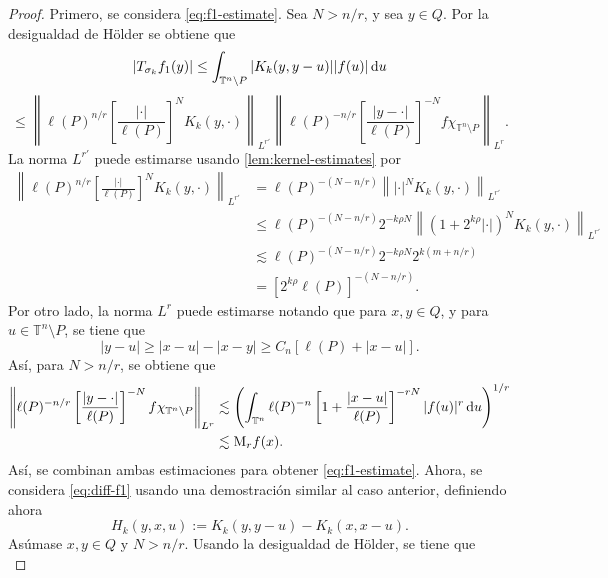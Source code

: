 \begin{proof}
	Primero, se considera \cref{eq:f1-estimate}. Sea $N>n/r$, y sea $y\in Q$. Por la desigualdad de H\"older se obtiene que
	\begin{equation*}
		|T_{\sigma_k}f_1(y)| \leq \int_{\mathbb{T}^n\setminus P} |K_k(y, y-u)||f(u)|\mathop{}\!\mathrm{d} u 
	\end{equation*}
	\begin{equation*}
		\leq \left\| \ell(P)^{n/r} \left[ \frac{|\cdot|}{\ell(P)} \right]^N K_k(y, \cdot) 
		\right\|_{L^{r'}} \left\| \ell(P)^{-n/r} \left[ \frac{|y-\cdot|}{\ell(P)} \right]^{-N} f\chi_{\mathbb{T}^n\setminus P} 
		\right\|_{L^r}.
	\end{equation*}
	La norma $L^{r'}$ puede estimarse usando \cref{lem:kernel-estimates} por 
	\begin{align*}
		\left\| \ell(P)^{n/r} \left[ \frac{|\cdot|}{\ell(P)} \right]^N K_k(y, \cdot) 
		\right\|_{L^{r'}} & = \ell(P)^{-(N-n/r)} \left\| |\cdot|^N K_k(y, \cdot)  \right\|_{L^{r'}} \\
		& \leq \ell(P)^{-(N-n/r)} 2^{-k\rho N} \left\| (1+2^{k\rho} |\cdot|)^N K_k(y, \cdot)  \right\|_{L^{r'}} \\
		& \lesssim \ell(P)^{-(N-n/r)} 2^{-k\rho N} 2^{k(m+n/r)}\\
		& = [2^{k\rho}\ell(P)]^{-(N-n/r)}.
	\end{align*}
	Por otro lado, la norma $L^r$ puede estimarse notando que para $x, y \in Q$, y para $u \in \mathbb{T}^n\setminus P$, se tiene que
	\begin{equation*}
		|y-u|\geq |x-u|-|x-y| \geq C_n[\ell(P)+|x-u|].
	\end{equation*}
	Así, para $N>n/r$, se obtiene que
\begin{align*}
	\left\| \ell(P)^{-n/r} \left[ \frac{|y-\cdot|}{\ell(P)} \right]^{-N}f \chi_{\mathbb{T}^n\setminus P}
	\right\|_{L^r}& \lesssim\left( \int_{\mathbb{T}^n} \ell(P)^{-n} \left[ 1+\frac{|x-u|}{\ell(P)}
	\right]^{-rN} |f(u)|^r \mathop{}\!\mathrm{d} u
	\right)^{1/r} \\
	& \lesssim\mathrm{M}_rf(x).
\end{align*}
Así, se combinan ambas estimaciones para obtener \cref{eq:f1-estimate}. Ahora, se considera \cref{eq:diff-f1} usando una demostración similar al caso anterior, definiendo ahora 
\begin{equation*}
	H_k(y, x, u) := K_k(y, y-u) - K_k(x, x-u).
\end{equation*}
Asúmase $x, y \in Q$ y $N>n/r$. Usando la desigualdad de H\"older, se tiene que
\begin{equation*}

\end{equation*}
\end{proof}
